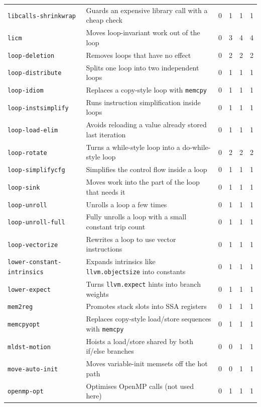 \documentclass[11pt,a4paper]{article}
\begin{document}
{\begin{longtable}{lp{6.4cm}rrrr}
\texttt{libcalls-shrinkwrap} & Guards an expensive library call with a cheap check & 0 & 1 & 1 & 1 \\
\texttt{licm} & Moves loop-invariant work out of the loop & 0 & 3 & 4 & 4 \\
\texttt{loop-deletion} & Removes loops that have no effect & 0 & 2 & 2 & 2 \\
\texttt{loop-distribute} & Splits one loop into two independent loops & 0 & 1 & 1 & 1 \\
\texttt{loop-idiom} & Replaces a copy-style loop with \texttt{memcpy} & 0 & 1 & 1 & 1 \\
\texttt{loop-instsimplify} & Runs instruction simplification inside loops & 0 & 1 & 1 & 1 \\
\texttt{loop-load-elim} & Avoids reloading a value already stored last iteration & 0 & 1 & 1 & 1 \\
\texttt{loop-rotate} & Turns a while-style loop into a do-while-style loop & 0 & 2 & 2 & 2 \\
\texttt{loop-simplifycfg} & Simplifies the control flow inside a loop & 0 & 1 & 1 & 1 \\
\texttt{loop-sink} & Moves work into the part of the loop that needs it & 0 & 1 & 1 & 1 \\
\texttt{loop-unroll} & Unrolls a loop a few times & 0 & 1 & 1 & 1 \\
\texttt{loop-unroll-full} & Fully unrolls a loop with a small constant trip count & 0 & 1 & 1 & 1 \\
\texttt{loop-vectorize} & Rewrites a loop to use vector instructions & 0 & 1 & 1 & 1 \\
\texttt{lower-constant-intrinsics} & Expands intrinsics like \texttt{llvm.objectsize} into constants & 0 & 1 & 1 & 1 \\
\texttt{lower-expect} & Turns \texttt{llvm.expect} hints into branch weights & 0 & 1 & 1 & 1 \\
\texttt{mem2reg} & Promotes stack slots into SSA registers & 0 & 1 & 1 & 1 \\
\texttt{memcpyopt} & Replaces copy-style load/store sequences with \texttt{memcpy} & 0 & 1 & 1 & 1 \\
\texttt{mldst-motion} & Hoists a load/store shared by both if/else branches & 0 & 0 & 1 & 1 \\
\texttt{move-auto-init} & Moves variable-init memsets off the hot path & 0 & 0 & 1 & 1 \\
\texttt{openmp-opt} & Optimises OpenMP calls (not used here) & 0 & 1 & 1 & 1 \\

\end{longtable}}
\end{document}
